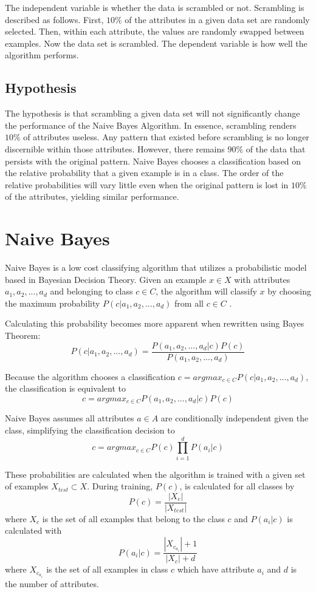 \documentclass[twoside,11pt]{article}
\begin{document}
The independent variable is whether the data is scrambled or not. Scrambling is described as follows. First, $10\%$ of the attributes in a given data set are randomly selected. Then, within each attribute, the values are randomly swapped between examples. Now the data set is scrambled. The dependent variable is how well the algorithm performs.

\subsection{Hypothesis}

The hypothesis is that scrambling a given data set will not significantly change the performance of the Naive Bayes Algorithm. In essence, scrambling renders $10\%$ of attributes useless. Any pattern that existed before scrambling is no longer discernible within those attributes. However, there remains $90\%$ of the data that persists with the original pattern. Naive Bayes chooses a classification based on the relative probability that a given example is in a class. The order of the relative probabilities will vary little even when the original pattern is lost in $10\%$ of the attributes, yielding similar performance.

\section{Naive Bayes}

Naive Bayes is a low cost classifying algorithm that utilizes a probabilistic model based in Bayesian Decision Theory. Given an example $x \in X$ with attributes $a_1, a_2, ..., a_d$ and belonging to class $c \in C$, the algorithm will classify $x$ by choosing the maximum probability $P(c|a_1, a_2, ..., a_d)$ from all $c \in C$ \citep{nbPaper}.

Calculating this probability becomes more apparent when rewritten using Bayes Theorem:
$$P(c|a_1, a_2, ..., a_d) = \frac{P(a_1, a_2, ..., a_d | c)P(c)}{P(a_1, a_2, ..., a_d)} $$

Because the algorithm chooses a classification $c = argmax_{c \in C}P(c|a_1, a_2, ..., a_d)$, the classification is equivalent to
$$c = argmax_{c \in C}P(a_1, a_2, ..., a_d | c)P(c)$$

Naive Bayes assumes all attributes $a \in A$ are conditionally independent given the class, simplifying the classification decision to 
$$c = argmax_{c \in C}P(c)\prod_{i = 1}^{d}P(a_i | c)$$

These probabilities are calculated when the algorithm is trained with a given set of examples $X_{test} \subset X$. During training, $P(c)$, is calculated for all classes by
$$P(c) = \frac{|X_c|}{|X_{test}|}$$
where $X_c$ is the set of all examples that belong to the class $c$ and $P(a_i | c)$ is calculated with
$$P(a_i | c) = \frac{|X_{c_{a_i}}| + 1}{|X_c| + d}$$
where $X_{c_{a_i}}$ is the set of all examples in class $c$ which have attribute $a_i$ and $d$ is the number of attributes.
\end{document}
